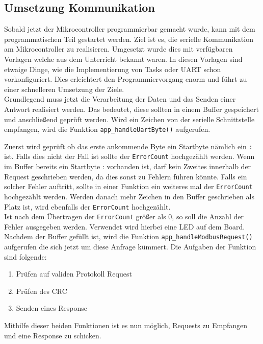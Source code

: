 \subsection{Umsetzung Kommunikation} \label{ssec:konzeptCardDeal}
Sobald jetzt der Mikrocontroller programmierbar gemacht wurde, kann mit dem programmatischen Teil gestartet werden.
Ziel ist es, die serielle Kommunikation am Mikrocontroller zu realisieren.
Umgesetzt wurde dies mit verfügbaren Vorlagen welche aus dem Unterricht bekannt waren.
In diesen Vorlagen sind etwaige Dinge, wie die Implementierung von Tasks oder UART schon vorkonfiguriert.
Dies erleichtert den Programmiervorgang enorm und führt zu einer schnelleren Umsetzung der Ziele.\\
Grundlegend muss jetzt die Verarbeitung der Daten und das Senden einer Antwort realisiert werden.
Das bedeutet, diese sollten in einem Buffer gespeichert und anschließend geprüft werden.
Wird ein Zeichen von der serielle Schnittstelle empfangen, wird die Funktion \lstinline[style=C]{app_handleUartByte()} aufgerufen.

Zuerst wird geprüft ob das erste ankommende Byte ein Startbyte nämlich ein \lstinline[style=C]{:} ist.
Falls dies nicht der Fall ist sollte der \lstinline[style=C]{ErrorCount} hochgezählt werden.
Wenn im Buffer bereits ein Startbyte : vorhanden ist, darf kein Zweites innerhalb der Request geschrieben werden, da dies sonst zu Fehlern führen könnte.
Falls ein solcher Fehler auftritt, sollte in einer Funktion ein weiteres mal der \lstinline[style=C]{ErrorCount} hochgezählt werden.
Werden danach mehr Zeichen in den Buffer geschrieben als Platz ist, wird ebenfalls der \lstinline[style=C]{ErrorCount} hochgezählt.\\
Ist nach dem Übertragen der \lstinline[style=C]{ErrorCount} größer als 0, so soll die Anzahl der Fehler ausgegeben werden.
Verwendet wird hierbei eine LED auf dem Board.\\
Nachdem der Buffer gefüllt ist, wird die Funktion \lstinline[style=C]{app_handleModbusRequest()} aufgerufen die sich jetzt um diese Anfrage kümmert.
Die Aufgaben der Funktion sind folgende:
\begin{enumerate}
\item Prüfen auf validen Protokoll Request
\item Prüfen des CRC
\item Senden eines Response
\end{enumerate}
Mithilfe dieser beiden Funktionen ist es nun möglich, Requests zu Empfangen und eine Response zu schicken.
\newpage
